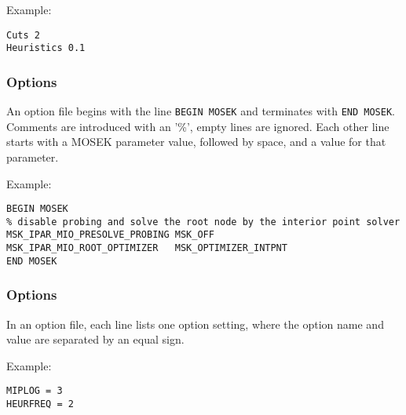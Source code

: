 Example:
\begin{verbatim}
Cuts 2
Heuristics 0.1
\end{verbatim}

\subsubsection{\OSIMOSEK Options}
An \OSIMOSEK option file begins with the line \texttt{BEGIN MOSEK} and terminates with \texttt{END MOSEK}.
Comments are introduced with an '\%', empty lines are ignored.
Each other line starts with a MOSEK parameter value, followed by space, and a value for that parameter.

Example:
\begin{verbatim}
BEGIN MOSEK
% disable probing and solve the root node by the interior point solver
MSK_IPAR_MIO_PRESOLVE_PROBING MSK_OFF
MSK_IPAR_MIO_ROOT_OPTIMIZER   MSK_OPTIMIZER_INTPNT
END MOSEK
\end{verbatim}

\subsubsection{\OSIXPRESS Options}
In an \OSIXPRESS option file, each line lists one option setting, where the option name and value are separated by an equal sign.

Example:
\begin{verbatim}
MIPLOG = 3
HEURFREQ = 2
\end{verbatim}





\chapterend
